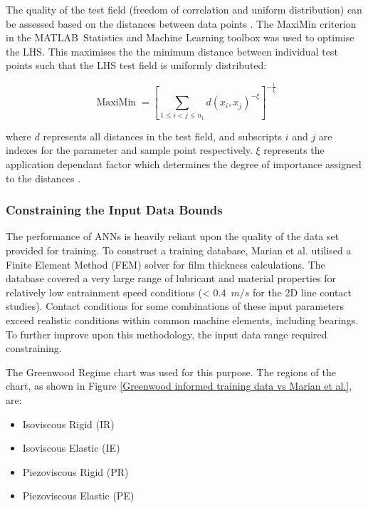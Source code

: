 The quality of the test field (freedom of correlation and uniform distribution) can be assessed based on the distances between data points \cite{Johnson1990}. The MaxiMin criterion in the MATLAB\textregistered\ Statistics and Machine Learning toolbox was used to optimise the LHS. This maximises the the minimum distance between individual test points such that the LHS test field is uniformly distributed:

\begin{equation}\label{maximin}
	\operatorname{MaxiMin}=\left[\sum_{1 \leq i<j \leq n_1} d\left(x_i, x_j\right)^{-\xi}\right]^{-\frac{1}{\xi}}
\end{equation}

where $d$ represents all distances in the test field, and subscripts $i$ and $j$ are indexes for the parameter and sample point respectively. $\xi$ represents the application dependant factor which determines the degree of importance assigned to the distances \cite{Siebertz2010}.

\subsubsection{Constraining the Input Data Bounds}

The performance of ANNs is heavily reliant upon the quality of the data set provided for training. To construct a training database, Marian et al. \cite{Marian2022} utilised a Finite Element Method (FEM) solver for film thickness calculations. The database covered a very large range of lubricant and material properties for relatively low entrainment speed conditions (< 0.4~$m/s$ for the 2D line contact studies). Contact conditions for some combinations of these input parameters exceed realistic conditions within common machine elements, including bearings. To further improve upon this methodology, the input data range required constraining.

The Greenwood Regime chart \cite{Johnson1970} was used for this purpose. The regions of the chart, as shown in Figure \ref{Greenwood informed training data vs Marian et al.}, are:

\begin{itemize}
	\item Isoviscous Rigid (IR)
	\item Isoviscous Elastic (IE)
	\item Piezoviscous Rigid (PR)
	\item Piezoviscous Elastic (PE)
\end{itemize}

